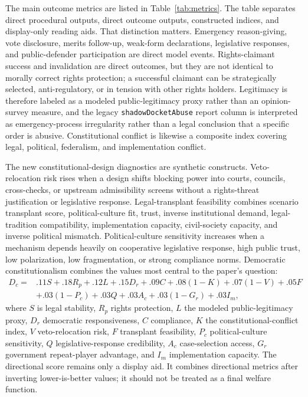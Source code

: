 \documentclass[
  journal=small,
  manuscript=research-article,
  year=2026
]{cup-journal}
\begin{document}
The main outcome metrics are listed in Table~\ref{tab:metrics}. The table separates direct procedural outputs, direct outcome outputs, constructed indices, and display-only reading aids. That distinction matters. Emergency reason-giving, vote disclosure, merits follow-up, weak-form declarations, legislative responses, and public-defender participation are direct model events. Rights-claimant success and invalidation are direct outcomes, but they are not identical to morally correct rights protection; a successful claimant can be strategically selected, anti-regulatory, or in tension with other rights holders. Legitimacy is therefore labeled as a modeled public-legitimacy proxy rather than an opinion-survey measure, and the legacy \texttt{shadowDocketAbuse} report column is interpreted as emergency-process irregularity rather than a legal conclusion that a specific order is abusive. Constitutional conflict is likewise a composite index covering legal, political, federalism, and implementation conflict.

The new constitutional-design diagnostics are synthetic constructs. Veto-relocation risk rises when a design shifts blocking power into courts, councils, cross-checks, or upstream admissibility screens without a rights-threat justification or legislative response. Legal-transplant feasibility combines scenario transplant score, political-culture fit, trust, inverse institutional demand, legal-tradition compatibility, implementation capacity, civil-society capacity, and inverse political mismatch. Political-culture sensitivity increases when a mechanism depends heavily on cooperative legislative response, high public trust, low polarization, low fragmentation, or strong compliance norms. Democratic constitutionalism combines the values most central to the paper's question:
\[
\begin{aligned}
D_c={}&.11S+.18R_p+.12L+.15D_r+.09C+.08(1-K)+.07(1-V)+.05F\\
&+.03(1-P_c)+.03Q+.03A_c+.03(1-G_r)+.03I_m,
\end{aligned}
\]
where $S$ is legal stability, $R_p$ rights protection, $L$ the modeled public-legitimacy proxy, $D_r$ democratic responsiveness, $C$ compliance, $K$ the constitutional-conflict index, $V$ veto-relocation risk, $F$ transplant feasibility, $P_c$ political-culture sensitivity, $Q$ legislative-response credibility, $A_c$ case-selection access, $G_r$ government repeat-player advantage, and $I_m$ implementation capacity. The directional score remains only a display aid. It combines directional metrics after inverting lower-is-better values; it should not be treated as a final welfare function.
\end{document}
